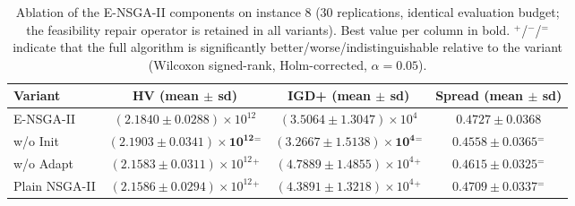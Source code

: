 \begin{table}[!htb]
\centering
\caption{Ablation of the E-NSGA-II components on instance 8
(30 replications, identical evaluation budget; the
feasibility repair operator is retained in all variants). Best value per
column in bold. $^{+}$/$^{-}$/$^{=}$ indicate that the full algorithm is
significantly better/worse/indistinguishable relative to the variant
(Wilcoxon signed-rank, Holm-corrected, $\alpha=0.05$).}
\label{tab:Ablation}
\begin{tabular}{@{}lccc@{}}
\toprule
Variant & HV (mean $\pm$ sd) & IGD+ (mean $\pm$ sd) & Spread (mean $\pm$ sd) \\
\midrule
E-NSGA-II & $(2.1840 \pm 0.0288)\times 10^{12}$ & $(3.5064 \pm 1.3047)\times 10^{4}$ & $0.4727 \pm 0.0368$ \\
w/o Init & $\mathbf{(2.1903 \pm 0.0341)\times 10^{12}}{}^{=}$ & $\mathbf{(3.2667 \pm 1.5138)\times 10^{4}}{}^{=}$ & $\mathbf{0.4558 \pm 0.0365}{}^{=}$ \\
w/o Adapt & $(2.1583 \pm 0.0311)\times 10^{12}{}^{+}$ & $(4.7889 \pm 1.4855)\times 10^{4}{}^{+}$ & $0.4615 \pm 0.0325{}^{=}$ \\
Plain NSGA-II & $(2.1586 \pm 0.0294)\times 10^{12}{}^{+}$ & $(4.3891 \pm 1.3218)\times 10^{4}{}^{+}$ & $0.4709 \pm 0.0337{}^{=}$ \\
\bottomrule
\end{tabular}
\end{table}
